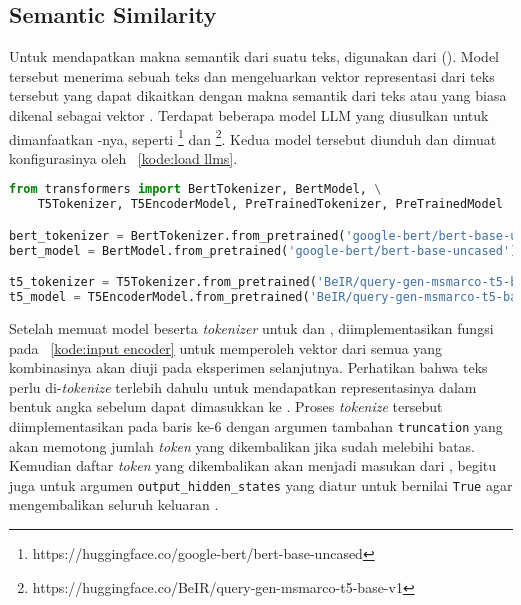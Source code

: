 \subsection{Semantic Similarity}
\label{subbab:4:Ekstraksi Fitur:Semantic Similarity}
Untuk mendapatkan makna semantik dari suatu teks, digunakan \encoder{} dari \llm{} (\LLM{}). Model tersebut menerima sebuah teks dan mengeluarkan vektor representasi dari teks tersebut yang dapat dikaitkan dengan makna semantik dari teks atau yang biasa dikenal sebagai vektor \embedding{}. Terdapat beberapa model LLM yang diusulkan untuk dimanfaatkan \encoder{}-nya, seperti \bert{}\footnote{https://huggingface.co/google-bert/bert-base-uncased} dan \tfive{}\footnote{https://huggingface.co/BeIR/query-gen-msmarco-t5-base-v1}. Kedua model \LLM{} tersebut diunduh dan dimuat konfigurasinya oleh \kode{}~\ref{kode:load llms}.
\begin{lstlisting}[language=Python, caption={\textit{Load} \encoder{} dan model yang sudah dilatih}, label={kode:load llms}]
from transformers import BertTokenizer, BertModel, \
    T5Tokenizer, T5EncoderModel, PreTrainedTokenizer, PreTrainedModel

bert_tokenizer = BertTokenizer.from_pretrained('google-bert/bert-base-uncased')
bert_model = BertModel.from_pretrained('google-bert/bert-base-uncased')

t5_tokenizer = T5Tokenizer.from_pretrained('BeIR/query-gen-msmarco-t5-base-v1')
t5_model = T5EncoderModel.from_pretrained('BeIR/query-gen-msmarco-t5-base-v1')
\end{lstlisting}


Setelah memuat model beserta \textit{tokenizer} untuk \bert{} dan \tfive{}, diimplementasikan fungsi pada \kode{}~\ref{kode:input encoder} untuk memperoleh vektor dari semua \hs{} yang kombinasinya akan diuji pada eksperimen selanjutnya. Perhatikan bahwa teks perlu di-\textit{tokenize} terlebih dahulu untuk mendapatkan representasinya dalam bentuk angka sebelum dapat dimasukkan ke \encoder{}. Proses \textit{tokenize} tersebut diimplementasikan pada baris ke-6 dengan argumen tambahan \lstinline{truncation} yang akan memotong jumlah \textit{token} yang dikembalikan jika sudah melebihi batas. Kemudian daftar \textit{token} yang dikembalikan akan menjadi masukan dari \encoder{}, begitu juga untuk argumen \lstinline{output_hidden_states} yang diatur untuk bernilai \lstinline{True} agar \encoder{} mengembalikan seluruh keluaran \hs{}.

